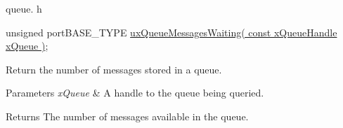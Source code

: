 queue. h 
\begin{DoxyPre}unsigned portBASE\_TYPE \hyperlink{win32_2win32_2_libraries_2_free_r_t_o_s_2_source_2queue_8c_a04f769c6ac8e393b3279f7f8216caf26}{uxQueueMessagesWaiting( const xQueueHandle xQueue )};\end{DoxyPre}


Return the number of messages stored in a queue.


\begin{DoxyParams}{Parameters}
{\em x\-Queue} & A handle to the queue being queried.\\
\hline
\end{DoxyParams}
\begin{DoxyReturn}{Returns}
The number of messages available in the queue. 
\end{DoxyReturn}
